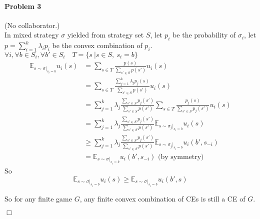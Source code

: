 \documentclass[12pt]{article}
\newenvironment{proof}{\noindent{\em Proof.} \hspace*{1mm}}{
\hspace*{\fill} $\Box$ }
\begin{document}
\paragraph{Problem 3} (No collaborator.)\\
\begin{proof}
In mixed strategy $\sigma$ yielded from strategy set $S$, let $p_i$ be the probability of $\sigma_i$, let $p=\displaystyle \sum_{i=1}^k \lambda_i p_i$ be the convex combination of $p_i$.
\\
$\forall i, \forall b \in S_i, \forall b' \in S_i \quad T=\{s \ |s\in S, \ s_i=b\}$
\begin{align*}
\displaystyle
\mathbb{E}_{s \sim \sigma |_{s_i=b}} u_i(s)
&=\sum_{s \in T} \frac{p(s)}{\displaystyle \sum_{s' \in S} p(s')} u_i(s)\\
&=\sum_{s \in T} \frac{\displaystyle\sum_{j=1}^k \lambda_j p_j(s)}{\displaystyle \sum_{s' \in S} p(s')} u_i(s)\\
&=\displaystyle\sum_{j=1}^k \lambda_j \frac{\displaystyle \sum_{s' \in S} p_j(s')}{\displaystyle \sum_{s' \in S} p(s')} \sum_{s \in T}  \frac{p_j(s)}{\displaystyle \sum_{s' \in S} p_j(s')} u_i(s)\\
&=\displaystyle\sum_{j=1}^k \lambda_j \frac{\displaystyle \sum_{s' \in S} p_j(s')}{\displaystyle \sum_{s' \in S} p(s')} \mathbb{E}_{s \sim \sigma_j |_{s_i=b}} u_i(s)\\
&\ge \displaystyle\sum_{j=1}^k \lambda_j \frac{\displaystyle \sum_{s' \in S} p_j(s')}{\displaystyle \sum_{s' \in S} p(s')} \mathbb{E}_{s \sim \sigma_j |_{s_i=b}} u_i(b', s_{-i})\\
&=\mathbb{E}_{s \sim \sigma |_{s_i=b}} u_i(b', s_{-i}) \mbox{ (by symmetry)}
\end{align*}
So
$$\mathbb{E}_{s \sim \sigma |_{s_i=b}} u_i(s) \ge \mathbb{E}_{s \sim \sigma |_{s_i=b}} u_i(b', s)$$

So for any finite game $G$, any finite convex combination of CEs is still a CE of $G$.
\end{proof}




\begin{thebibliography}{99}



\end{thebibliography}
\end{document}
